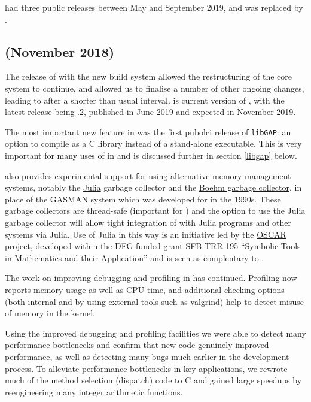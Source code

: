 \documentclass{deliverablereport}
\begin{document}
 had three public releases between May and September 2019, and
was replaced by .

\subsection{ (November 2018)}\label{gap-4.10}

The release of  with the new build system allowed the
restructuring of the core \GAP system to continue, and allowed us to
finalise a number of other ongoing changes, leading to 
after a shorter than usual interval.  is current
version of \GAP, with the latest release being .2, published
in June 2019 and  expected in November 2019.

The most important new feature in  was the first pubolci
release of \texttt{libGAP}: an
option to compile \GAP as a C library instead of a stand-alone
executable. This is very important for many uses of \GAP in \ODK and
is discussed further in section \ref{libgap} below.

 also provides experimental support for using alternative
memory management systems, notably the \href{??}{Julia} garbage
collector and the \href{???}{Boehm garbage collector}, in place of the
GASMAN system which was developed for  in the 1990s.  These
garbage collectors are thread-safe (important for \HPCGAP) and the
option to use the Julia garbage collector will allow tight integration
of \GAP with Julia programs and other systems via Julia. Use of Julia
in this way is an initiative led by the
\href{https://oscar.computeralgebra.de/}{OSCAR} project, developed
within the DFG-funded grant SFB-TRR 195 ``Symbolic Tools in
Mathematics and their Application'' and is seen as complentary to \ODK.

The work on improving debugging and profiling in \GAP has
continued. Profiling now reports memory usage as well as CPU time, and
additional checking options (both internal and by using external tools such as
\href{???}{valgrind}) help to detect misuse of memory in the kernel.

Using the improved debugging and profiling facilities we were able to
detect many performance bottlenecks and confirm that new code
genuinely improved performance, as well as detecting many bugs much
earlier in the development process. To alleviate performance
bottlenecks in key applications, we rewrote much of the method
selection (dispatch) code \GAP to C and gained large speedups by
reengineering many integer arithmetic functions.
\end{document}

